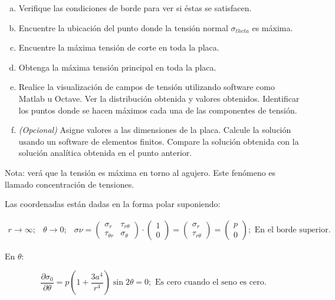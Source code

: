 \documentclass[a4paper,12pt,twoside,final,spanish]{article}
\begin{document}
\begin{enumerate}[a.]
\item Verifique las condiciones de borde para ver si éstas se satisfacen.
\item Encuentre la ubicación del punto donde la tensión normal $\sigma_{theta}$ es máxima.
\item Encuentre la máxima tensión de corte en toda la placa.
\item Obtenga la máxima tensión principal en toda la placa.
\item Realice la visualización de campos de tensión utilizando software como Matlab u Octave. Ver la distribución obtenida y valores obtenidos. Identificar los puntos donde se hacen máximos cada una de las componentes de tensión.
\item \textit{(Opcional)} Asigne valores a las dimensiones de la placa. Calcule la solución usando un software de elementos finitos. Compare la solución obtenida con la solución analítica obtenida en el punto anterior.
\end{enumerate}

Nota: verá que la tensión es máxima en torno al agujero. Este fenómeno es llamado 
concentración de tensiones.

\dotfill

Las coordenadas están dadas en la forma polar suponiendo:

\[
\begin{array}{ccc}
r\to\infty; &
\theta\to 0; &
\sigma\nu
=\begin{pmatrix}
\sigma_{r}      & \tau_{r\theta} \\
\tau_{\theta r} & \sigma_{\theta}
\end{pmatrix}
\cdot
\begin{pmatrix}
1 \\
0
\end{pmatrix}
=\begin{pmatrix}
\sigma_{r} \\
\tau_{r\theta}
\end{pmatrix}
=\begin{pmatrix}
p \\
0
\end{pmatrix};
\mbox{ En el borde superior.}
\end{array}
\] 

En $\theta$:

\[
\frac{\partial\sigma_{0}}{\partial\theta}
=p\left(1+\frac{3a^{4}}{r^{4}}\right)\sin 2\theta=0;
\text{ Es cero cuando el seno es cero.}
\]
\end{document}

